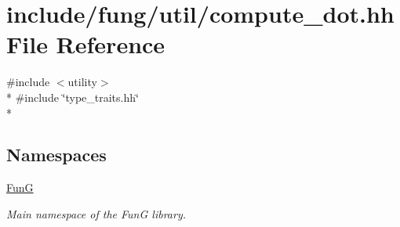 \hypertarget{compute__dot_8hh}{\section{include/fung/util/compute\-\_\-dot.hh File Reference}
\label{compute__dot_8hh}
}
{\ttfamily \#include $<$utility$>$}\\*
{\ttfamily \#include \char`\"{}type\-\_\-traits.\-hh\char`\"{}}\\*
\subsection*{Namespaces}
\begin{DoxyCompactItemize}
\item 
\hyperlink{namespaceFunG}{Fun\-G}
\begin{DoxyCompactList}\small\item\em Main namespace of the Fun\-G library. \end{DoxyCompactList}\end{DoxyCompactItemize}
